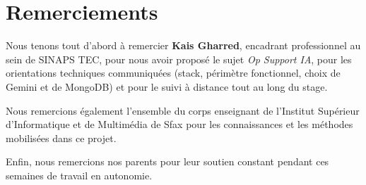 \chapter*{Remerciements}

Nous tenons tout d'abord à remercier \textbf{Kais Gharred}, encadrant professionnel au sein de SINAPS TEC, pour nous avoir proposé le sujet \textit{Op Support IA}, pour les orientations techniques communiquées (stack, périmètre fonctionnel, choix de Gemini et de MongoDB) et pour le suivi à distance tout au long du stage.

Nous remercions également l'ensemble du corps enseignant de l'Institut Supérieur d'Informatique et de Multimédia de Sfax pour les connaissances et les méthodes mobilisées dans ce projet.

Enfin, nous remercions nos parents pour leur soutien constant pendant ces semaines de travail en autonomie.
